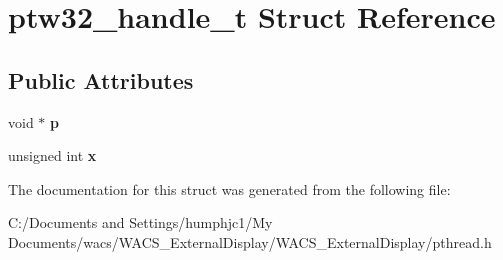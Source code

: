 \hypertarget{structptw32__handle__t}{
\section{ptw32\_\-handle\_\-t Struct Reference}
\label{structptw32__handle__t}
}
\subsection*{Public Attributes}
\begin{DoxyCompactItemize}
\item 
\hypertarget{structptw32__handle__t_ad5c9721a0ae3e8d13766c5d901c8a157}{
void $\ast$ {\bfseries p}}
\label{structptw32__handle__t_ad5c9721a0ae3e8d13766c5d901c8a157}

\item 
\hypertarget{structptw32__handle__t_a156e4e4394eb30aa3f977794496db34b}{
unsigned int {\bfseries x}}
\label{structptw32__handle__t_a156e4e4394eb30aa3f977794496db34b}

\end{DoxyCompactItemize}


The documentation for this struct was generated from the following file:\begin{DoxyCompactItemize}
\item 
C:/Documents and Settings/humphjc1/My Documents/wacs/WACS\_\-ExternalDisplay/WACS\_\-ExternalDisplay/pthread.h\end{DoxyCompactItemize}
